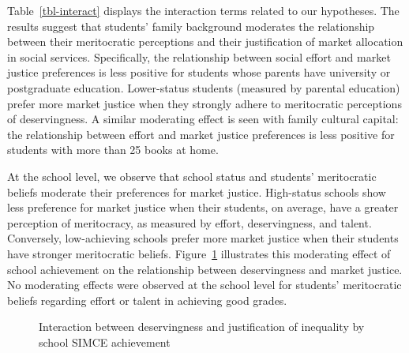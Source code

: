 \documentclass[
  12pt,
  letterpaper,
]{article}
\begin{document}
Table~\ref{tbl-interact} displays the interaction terms related to our
hypotheses. The results suggest that students' family background
moderates the relationship between their meritocratic perceptions and
their justification of market allocation in social services.
Specifically, the relationship between social effort and market justice
preferences is less positive for students whose parents have university
or postgraduate education. Lower-status students (measured by parental
education) prefer more market justice when they strongly adhere to
meritocratic perceptions of deservingness. A similar moderating effect
is seen with family cultural capital: the relationship between effort
and market justice preferences is less positive for students with more
than 25 books at home.

At the school level, we observe that school status and students'
meritocratic beliefs moderate their preferences for market justice.
High-status schools show less preference for market justice when their
students, on average, have a greater perception of meritocracy, as
measured by effort, deservingness, and talent. Conversely, low-achieving
schools prefer more market justice when their students have stronger
meritocratic beliefs. Figure~\ref{fig-interaction} illustrates this
moderating effect of school achievement on the relationship between
deservingness and market justice. No moderating effects were observed at
the school level for students' meritocratic beliefs regarding effort or
talent in achieving good grades.

\begin{figure}


\caption{\label{fig-interaction}Interaction between deservingness and
justification of inequality by school SIMCE achievement}

\end{figure}%
\end{document}
